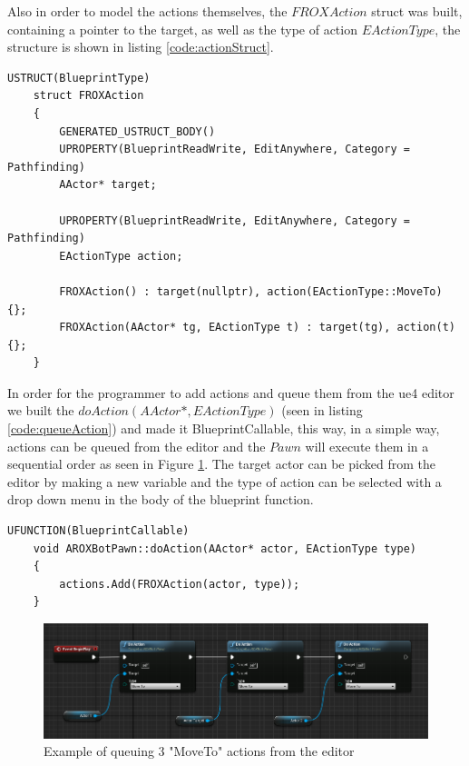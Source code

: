 Also in order to model the actions themselves, the $FROXAction$ struct was built, containing a pointer to the target, as well as the type of action $EActionType$, the structure is shown in listing \ref{code:actionStruct}.

\begin{lstlisting}[style=C++, caption=FROXAction struct, frame=single, label=code:actionStruct]
	USTRUCT(BlueprintType)
	struct FROXAction
	{
		GENERATED_USTRUCT_BODY()
		UPROPERTY(BlueprintReadWrite, EditAnywhere, Category = Pathfinding)
		AActor* target;
		
		UPROPERTY(BlueprintReadWrite, EditAnywhere, Category = Pathfinding)
		EActionType action;
		
		FROXAction() : target(nullptr), action(EActionType::MoveTo) {};
		FROXAction(AActor* tg, EActionType t) : target(tg), action(t) {};
	}
\end{lstlisting}

In order for the programmer to add actions and queue them from the \gls{ue4} editor we built the $doAction(AActor*, EActionType)$ (seen in listing \ref{code:queueAction}) and made it BlueprintCallable, this way, in a simple way, actions can be queued from the editor and the $Pawn$ will execute them in a sequential order as seen in Figure \ref{action_queue}. The target actor can be picked from the editor by making a new variable and the type of action can be selected with a drop down menu in the body of the blueprint function.

\begin{lstlisting}[style=C++, caption=doAction function which queues a new FROXAction to the system, frame=single, label=code:queueAction]
	UFUNCTION(BlueprintCallable)
	void AROXBotPawn::doAction(AActor* actor, EActionType type) 
	{	
		actions.Add(FROXAction(actor, type));
	}
\end{lstlisting}

\begin{figure}[h]
	\includegraphics[scale=0.4]{archivos/action_queue.png}
	\centering
	\caption{Example of queuing 3 "MoveTo" actions from the editor}
	\label{action_queue}
\end{figure}

